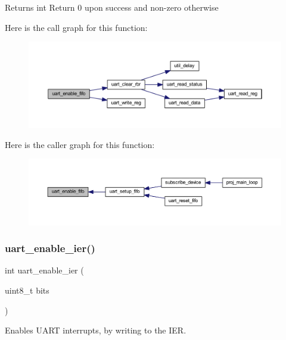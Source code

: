 \begin{DoxyReturn}{Returns}
int Return 0 upon success and non-\/zero otherwise 
\end{DoxyReturn}
Here is the call graph for this function\+:\nopagebreak
\begin{figure}[H]
\begin{center}
\leavevmode
\includegraphics[width=350pt]{group__uart_gacc4e9858f70ddd58ddb77dd4f7cc034d_cgraph}
\end{center}
\end{figure}
Here is the caller graph for this function\+:\nopagebreak
\begin{figure}[H]
\begin{center}
\leavevmode
\includegraphics[width=350pt]{group__uart_gacc4e9858f70ddd58ddb77dd4f7cc034d_icgraph}
\end{center}
\end{figure}
\mbox{\label{group__uart_gac9c7676f3d9f44d09e85ab65aa9e9d59}} 
\subsubsection{\texorpdfstring{uart\+\_\+enable\+\_\+ier()}{uart\_enable\_ier()}}
{\footnotesize\ttfamily int uart\+\_\+enable\+\_\+ier (\begin{DoxyParamCaption}\item[{uint8\+\_\+t}]{bits }\end{DoxyParamCaption})}



Enables U\+A\+RT interrupts, by writing to the I\+ER. 


